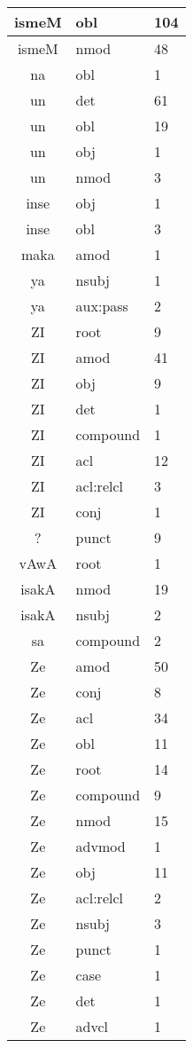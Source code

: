 \documentclass[a4 paper]{article}
\begin{document}
\begin{longtable}{cp{}p{}}
ismeM & obl & 104\\ \midrule ismeM & nmod & 48\\ \midrule 
na & obl & 1\\ \midrule 
un & det & 61\\ \midrule un & obl & 19\\ \midrule un & obj & 1\\ \midrule un & nmod & 3\\ \midrule 
inse & obj & 1\\ \midrule inse & obl & 3\\ \midrule 
maka & amod & 1\\ \midrule 
ya & nsubj & 1\\ \midrule ya & aux:pass & 2\\ \midrule 
ZI & root & 9\\ \midrule ZI & amod & 41\\ \midrule ZI & obj & 9\\ \midrule ZI & det & 1\\ \midrule ZI & compound & 1\\ \midrule ZI & acl & 12\\ \midrule ZI & acl:relcl & 3\\ \midrule ZI & conj & 1\\ \midrule 
? & punct & 9\\ \midrule 
vAwA & root & 1\\ \midrule 
isakA & nmod & 19\\ \midrule isakA & nsubj & 2\\ \midrule 
sa & compound & 2\\ \midrule 
Ze & amod & 50\\ \midrule Ze & conj & 8\\ \midrule Ze & acl & 34\\ \midrule Ze & obl & 11\\ \midrule Ze & root & 14\\ \midrule Ze & compound & 9\\ \midrule Ze & nmod & 15\\ \midrule Ze & advmod & 1\\ \midrule Ze & obj & 11\\ \midrule Ze & acl:relcl & 2\\ \midrule Ze & nsubj & 3\\ \midrule Ze & punct & 1\\ \midrule Ze & case & 1\\ \midrule Ze & det & 1\\ \midrule Ze & advcl & 1\\ \midrule 

\end{longtable}
\end{document}
